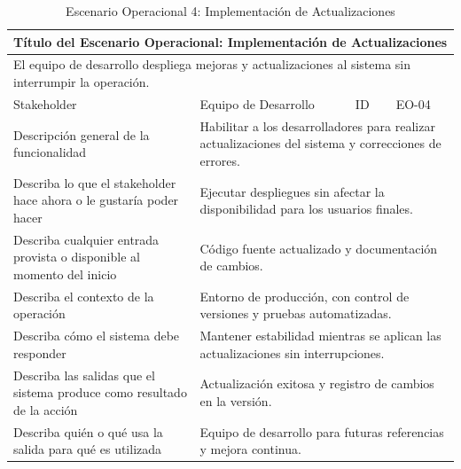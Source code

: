 \documentclass[12pt]{article}
\begin{document}
\begin{table}[H]
    \centering
    \begin{tabular}{|p{4cm}|p{4cm}|p{4cm}|p{4cm}|}
        \hline
        \multicolumn{4}{|l|}{\cellcolor{teal!50}\textbf{Título del Escenario Operacional: Implementación de Actualizaciones}} \\ \hline
        \multicolumn{4}{|p{16cm}|}{El equipo de desarrollo despliega mejoras y actualizaciones al sistema sin interrumpir la operación.} \\ \hline
        \multicolumn{1}{|p{4cm}|}{\cellcolor{teal!50}Stakeholder} & \multicolumn{1}{p{6cm}|}{Equipo de Desarrollo} & \multicolumn{1}{|p{2cm}|}{\cellcolor{teal!50}ID} & \multicolumn{1}{p{4cm}|}{EO-04} \\ \hline
        \multicolumn{1}{|p{4cm}|}{\cellcolor{teal!50}Descripción general de la funcionalidad} & \multicolumn{3}{p{12cm}|}{Habilitar a los desarrolladores para realizar actualizaciones del sistema y correcciones de errores.} \\ \hline
        \multicolumn{1}{|p{4cm}|}{\cellcolor{teal!50}Describa lo que el stakeholder hace ahora o le gustaría poder hacer} & \multicolumn{3}{p{12cm}|}{Ejecutar despliegues sin afectar la disponibilidad para los usuarios finales.} \\ \hline
        \multicolumn{1}{|p{4cm}|}{\cellcolor{teal!50}Describa cualquier entrada provista o disponible al momento del inicio} & \multicolumn{3}{p{12cm}|}{Código fuente actualizado y documentación de cambios.} \\ \hline
        \multicolumn{1}{|p{4cm}|}{\cellcolor{teal!50}Describa el contexto de la operación} & \multicolumn{3}{p{12cm}|}{Entorno de producción, con control de versiones y pruebas automatizadas.} \\ \hline
        \multicolumn{1}{|p{4cm}|}{\cellcolor{teal!50}Describa cómo el sistema debe responder} & \multicolumn{3}{p{12cm}|}{Mantener estabilidad mientras se aplican las actualizaciones sin interrupciones.} \\ \hline
        \multicolumn{1}{|p{4cm}|}{\cellcolor{teal!50}Describa las salidas que el sistema produce como resultado de la acción} & \multicolumn{3}{p{12cm}|}{Actualización exitosa y registro de cambios en la versión.} \\ \hline
        \multicolumn{1}{|p{4cm}|}{\cellcolor{teal!50}Describa quién o qué usa la salida para qué es utilizada} & \multicolumn{3}{p{12cm}|}{Equipo de desarrollo para futuras referencias y mejora continua.} \\ \hline
    \end{tabular}
    \caption{Escenario Operacional 4: Implementación de Actualizaciones}
    \label{tab:escenario_operacional_4}
\end{table}
\end{document}
